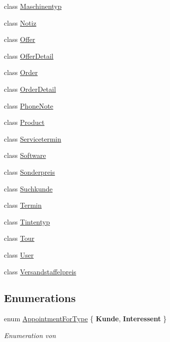 \begin{DoxyCompactItemize}
\item 
class \hyperlink{class_products_1_1_model_1_1_entities_1_1_maschinentyp}{Maschinentyp}
\item 
class \hyperlink{class_products_1_1_model_1_1_entities_1_1_notiz}{Notiz}
\item 
class \hyperlink{class_products_1_1_model_1_1_entities_1_1_offer}{Offer}
\item 
class \hyperlink{class_products_1_1_model_1_1_entities_1_1_offer_detail}{Offer\+Detail}
\item 
class \hyperlink{class_products_1_1_model_1_1_entities_1_1_order}{Order}
\item 
class \hyperlink{class_products_1_1_model_1_1_entities_1_1_order_detail}{Order\+Detail}
\item 
class \hyperlink{class_products_1_1_model_1_1_entities_1_1_phone_note}{Phone\+Note}
\item 
class \hyperlink{class_products_1_1_model_1_1_entities_1_1_product}{Product}
\item 
class \hyperlink{class_products_1_1_model_1_1_entities_1_1_servicetermin}{Servicetermin}
\item 
class \hyperlink{class_products_1_1_model_1_1_entities_1_1_software}{Software}
\item 
class \hyperlink{class_products_1_1_model_1_1_entities_1_1_sonderpreis}{Sonderpreis}
\item 
class \hyperlink{class_products_1_1_model_1_1_entities_1_1_suchkunde}{Suchkunde}
\item 
class \hyperlink{class_products_1_1_model_1_1_entities_1_1_termin}{Termin}
\item 
class \hyperlink{class_products_1_1_model_1_1_entities_1_1_tintentyp}{Tintentyp}
\item 
class \hyperlink{class_products_1_1_model_1_1_entities_1_1_tour}{Tour}
\item 
class \hyperlink{class_products_1_1_model_1_1_entities_1_1_user}{User}
\item 
class \hyperlink{class_products_1_1_model_1_1_entities_1_1_versandstaffelpreis}{Versandstaffelpreis}
\end{DoxyCompactItemize}
\subsection*{Enumerations}
\begin{DoxyCompactItemize}
\item 
enum \hyperlink{namespace_products_1_1_model_1_1_entities_aefe1aa1a1f657c594489271d04959c2d}{Appointment\+For\+Type} \{ {\bfseries Kunde}, 
{\bfseries Interessent}
 \}\begin{DoxyCompactList}\small\item\em Enumeration von \end{DoxyCompactList}
\end{DoxyCompactItemize}



